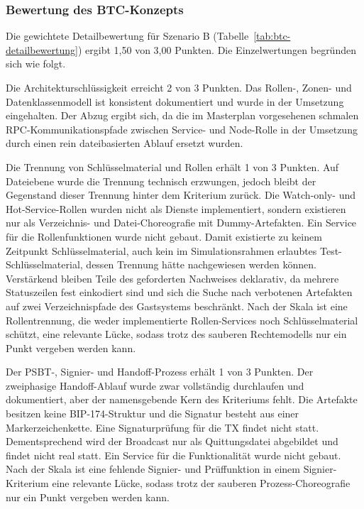 \subsubsection{Bewertung des \ac{BTC}-Konzepts}

Die gewichtete Detailbewertung für Szenario B (Tabelle~\ref{tab:btc-detailbewertung}) ergibt 1{,}50 von 3{,}00 Punkten. Die Einzelwertungen begründen sich wie folgt.

Die Architekturschlüssigkeit erreicht 2 von 3 Punkten. Das Rollen-, Zonen- und Datenklassenmodell ist konsistent dokumentiert und wurde in der Umsetzung eingehalten. 
Der Abzug ergibt sich, da die im Masterplan vorgesehenen schmalen \ac{RPC}-Kommunikationspfade zwischen Service- und Node-Rolle in der Umsetzung durch einen rein dateibasierten Ablauf ersetzt wurden.


Die Trennung von Schlüsselmaterial und Rollen erhält 1 von 3 Punkten. Auf Dateiebene wurde die Trennung technisch erzwungen, jedoch bleibt der Gegenstand dieser Trennung hinter dem Kriterium zurück. Die Watch-only- und Hot-Service-Rollen wurden nicht als Dienste implementiert, sondern existieren nur als Verzeichnis- und Datei-Choreografie mit Dummy-Artefakten. Ein Service für die Rollenfunktionen wurde nicht gebaut. Damit existierte zu keinem
Zeitpunkt Schlüsselmaterial, auch kein im Simulationsrahmen erlaubtes Test-Schlüsselmaterial, dessen Trennung hätte nachgewiesen werden können.
Verstärkend bleiben Teile des geforderten Nachweises deklarativ, da mehrere Statuszeilen fest einkodiert sind und sich die Suche nach verbotenen Artefakten auf zwei Verzeichnispfade des Gastsystems beschränkt. 
Nach der Skala ist eine Rollentrennung, die weder implementierte Rollen-Services noch
Schlüsselmaterial schützt, eine relevante Lücke, sodass trotz des sauberen Rechtemodells nur ein Punkt vergeben werden kann.

Der \ac{PSBT}-, Signier- und Handoff-Prozess erhält 1 von 3 Punkten. 
Der zweiphasige Handoff-Ablauf wurde zwar vollständig durchlaufen und dokumentiert, aber der namensgebende Kern des Kriteriums fehlt.
Die Artefakte besitzen keine \ac{BIP}-174-Struktur und die Signatur besteht aus einer Markerzeichenkette. Eine Signaturprüfung für die \ac{TX} findet nicht statt.
Dementsprechend wird der Broadcast nur als Quittungsdatei abgebildet und findet nicht real statt.
Ein Service für die Funktionalität wurde nicht gebaut.
Nach der Skala ist eine fehlende Signier- und Prüffunktion in einem Signier-Kriterium eine relevante Lücke, sodass trotz der sauberen Prozess-Choreografie nur ein Punkt vergeben werden kann.

